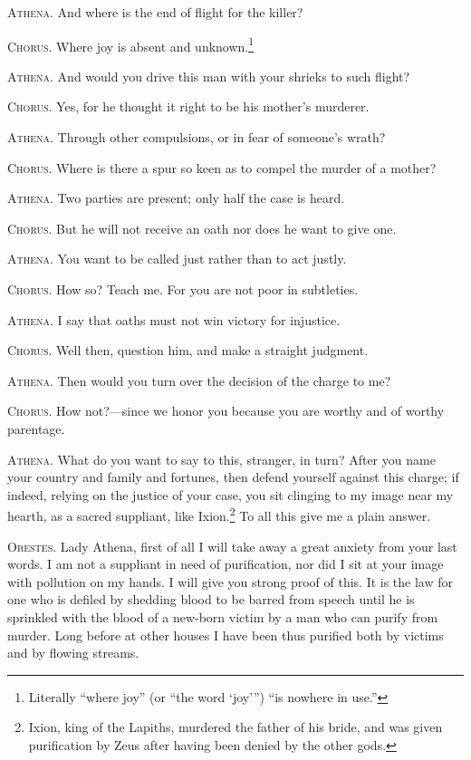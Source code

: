 \documentclass[12pt]{article}
\begin{document}
\textsc{Athena.} And where is the end of flight for the killer?

\textsc{Chorus.} Where joy is absent and unknown.\footnote{Literally ``where joy'' (or ``the word `joy'{''}) ``is nowhere in use.''}

\textsc{Athena.} And would you drive this man with your shrieks to such flight?

\textsc{Chorus.} Yes, for he thought it right to be his mother's murderer.

\textsc{Athena.} Through other compulsions, or in fear of someone's wrath?

\textsc{Chorus.} Where is there a spur so keen as to compel the murder of a mother?

\textsc{Athena.} Two parties are present; only half the case is heard.

\textsc{Chorus.} But he will not receive an oath nor does he want to give one.

\textsc{Athena.} You want to be called just rather than to act justly.

\textsc{Chorus.} How so? Teach me. For you are not poor in subtleties.

\textsc{Athena.} I say that oaths must not win victory for injustice.

\textsc{Chorus.} Well then, question him, and make a straight judgment.

\textsc{Athena.} Then would you turn over the decision of the charge to me?

\textsc{Chorus.} How not?---since we honor you because you are worthy and of worthy parentage.

\textsc{Athena.} What do you want to say to this, stranger, in turn? After you name your country and family and fortunes, then defend yourself against this charge; if indeed, relying on the justice of your case, you sit clinging to my image near my hearth, as a sacred suppliant, like Ixion.\footnote{Ixion, king of the Lapiths, murdered the father of his bride, and was given purification by Zeus after having been denied by the other gods.} To all this give me a plain answer.

\textsc{Orestes.} Lady Athena, first of all I will take away a great anxiety from your last words. I am not a suppliant in need of purification, nor did I sit at your image with pollution on my hands. I will give you strong proof of this. It is the law for one who is defiled by shedding blood to be barred from speech until he is sprinkled with the blood of a new-born victim by a man who can purify from murder. Long before at other houses I have been thus purified both by victims and by flowing streams.
\end{document}
